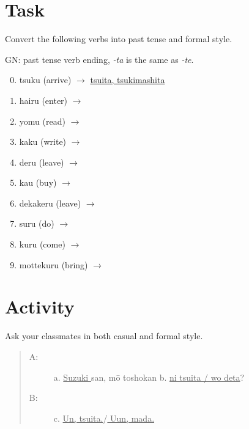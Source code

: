 \documentclass[uplatex,a4paper]{jsarticle}
\begin{document}
\vspace*{-1\baselineskip}

\section{Task}
 
 Convert the following verbs into past tense and formal style.
 
 GN: past tense verb ending, {\itshape -ta} is the same as {\itshape -te}.

\begin{multicols}{2}
\begin{enumerate}
\setcounter{enumi}{-1}   
\item tsuku (arrive) $\rightarrow$ \underline{ tsuita, tsukimashita \hspace*{2em}}
 \item hairu (enter) $\rightarrow$\hrulefill
 \item yomu (read)   $\rightarrow$ \hrulefill
 \item kaku (write)  $\rightarrow$ \hrulefill
 \item deru (leave)  $\rightarrow$ \hrulefill
 \item kau (buy)     $\rightarrow$ \hrulefill
 \item dekakeru (leave) $\rightarrow$ \hrulefill
 \item suru (do)     $\rightarrow$ \hrulefill 
 \item kuru (come)   $\rightarrow$ \hrulefill
 \item mottekuru (bring) $\rightarrow$ \hrulefill
\end{enumerate}
\end{multicols}

\vspace*{-1\baselineskip}

\section{Activity}

Ask your classmates in both casual and formal style.

\begin{quote}
\begin{description}
 \item[A:] a. \underline{ Suzuki } san, m\=o toshokan b. \underline{ ni tsuita / wo deta}? 
 \item[B:] c. \underline{ Un, tsuita.}/\underline{ Uun, mada.}
\end{description}
\end{quote}
 
\end{document}
